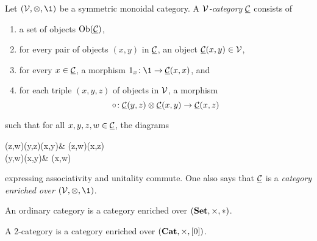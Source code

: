 \begin{definition}
	Let \((\calV,\otimes,\1)\) be a symmetric monoidal category. A \(\mathcal{V}\)\emph{-category} \(\underline{\mathcal{C}}\) consists of
	\begin{enumerate}[label=(\arabic*)]
	\item a set of objects \(\operatorname{Ob}(\underline{\mathcal{C}})\),
	\item for every pair of objects \((x,y)\) in \(\underline{\mathcal{C}}\), an object \(\underline{\mathcal{C}}(x,y)\in\mathcal{V}\),
	\item for every \(x\in\underline{\mathcal{C}}\), a morphism \(1_x\!:\1\to\underline\calC(x,x)\), and
	\item for each triple \((x,y,z)\) of objects in \(\mathcal{V}\), a morphism
	\[ \circ\!:\underline{\mathcal{C}}(y,z)\otimes\underline{\mathcal{C}}(x,y)\to\underline{\mathcal{C}}(x,z) \]
	\end{enumerate}
	such that for all \(x,y,z,w\in\underline{\mathcal{C}}\), the diagrams
	\begin{diagram*}
		\underline\calC(z,w)\otimes\underline\calC(y,z)\otimes\underline\calC(x,y) & \underline\calC(z,w)\otimes\underline\calC(x,z)\ar[d,"\circ"] \\
		\underline\calC(y,w)\otimes\underline\calC(x,y)\ar[r,"\circ"] & \underline\calC(x,w)
	\end{diagram*}
	\begin{center}
	\quad
	\end{center}
	expressing associativity and unitality commute. One also says that \(\underline{\mathcal{C}}\) is a \emph{category enriched over} \((\calV,\otimes,\1)\).
\end{definition}
\begin{example}
	An ordinary category is a category enriched over \((\mathbf{Set},\times,*)\).
\end{example}
\begin{example}
	A 2-category is a category enriched over \((\mathbf{Cat},\times,[0])\).
\end{example}
